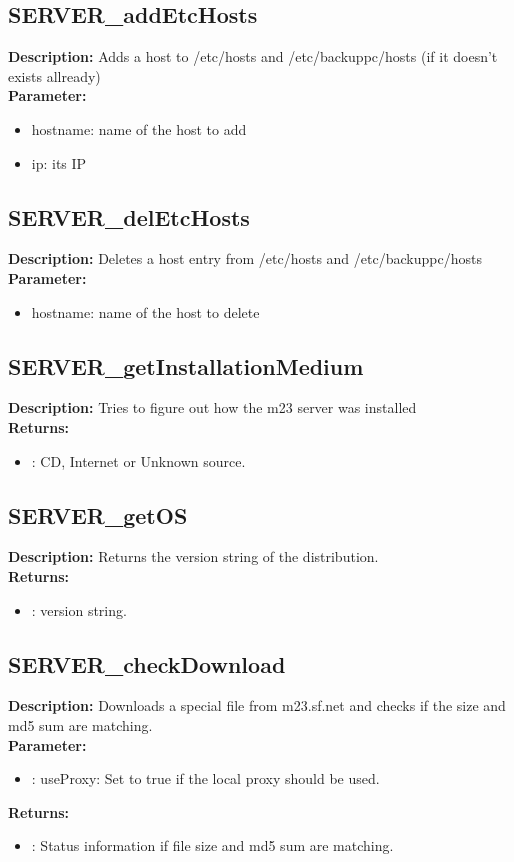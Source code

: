 \subsection{SERVER\_addEtcHosts}
\textbf{Description:} Adds a host to /etc/hosts and /etc/backuppc/hosts (if it doesn't exists allready)\\
\textbf{Parameter:}
\begin{itemize}
\item hostname: name of the host to add
\item ip: its IP
\end{itemize}

\subsection{SERVER\_delEtcHosts}
\textbf{Description:} Deletes a host entry from /etc/hosts and /etc/backuppc/hosts\\
\textbf{Parameter:}
\begin{itemize}
\item hostname: name of the host to delete
\end{itemize}

\subsection{SERVER\_getInstallationMedium}
\textbf{Description:} Tries to figure out how the m23 server was installed\\
\textbf{Returns:}
\begin{itemize}
\item : CD, Internet or Unknown source.
\end{itemize}

\subsection{SERVER\_getOS}
\textbf{Description:} Returns the version string of the distribution.\\
\textbf{Returns:}
\begin{itemize}
\item : version string.
\end{itemize}

\subsection{SERVER\_checkDownload}
\textbf{Description:} Downloads a special file from m23.sf.net and checks if the size and md5 sum are matching.\\
\textbf{Parameter:}
\begin{itemize}
\item : useProxy: Set to true if the local proxy should be used.
\end{itemize}
\textbf{Returns:}
\begin{itemize}
\item : Status information if file size and md5 sum are matching.
\end{itemize}

